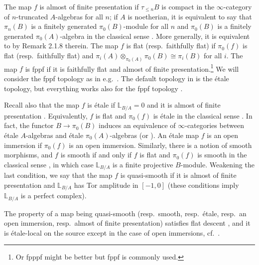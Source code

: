 \documentclass{amsart}
\theoremstyle{definition}
\theoremstyle{remark}
\numberwithin{equation}{section}
\newcommand{\bb}{\mathbb}
\begin{document}
The map $f$ is almost of finite presentation if $\tau_{\leq n} B$ is compact in the $\infty$-category of $n$-truncated $A$-algebras for all $n$; if $A$ is noetherian, it is equivalent to say that $\pi_n(B)$ is a finitely generated $\pi_0(B)$-module for all $n$ and $\pi_0(B)$ is a finitely generated $\pi_0(A)$-algebra in the classical sense \cite[Proposition 3.1.5]{LurieThesis}. More generally, it is equivalent to \cite[Definition 2.1.6]{HansenMann} by Remark 2.1.8 therein. The map $f$ is flat (resp.~faithfully flat) if $\pi_0(f)$ is flat (resp.~faithfully flat) and $\pi_i(A)\otimes_{\pi_0(A)}\pi_0(B)\cong \pi_i(B)$ for all $i$. The map $f$ is fppf if it is faithfully flat and almost of finite presentation.\footnote{Or fpppf might be better but fppf is commonly used.} We will consider the fppf topology as in e.g.~\cite{DrinfeldGaitsgory}. The default topology in \cite{GRI} is the \'etale topology, but everything works also for the fppf topology \cite[\S 2.2.3.2]{GRI}. 

Recall also that the map $f$ is \'etale if $\bb L_{B/A}=0$ and it is almost of finite presentation \cite[Definition 3.4.7]{LurieThesis}. Equivalently, $f$ is flat and $\pi_0(f)$ is \'etale in the classical sense \cite[Proposition 3.4.10]{LurieThesis}. In fact, the functor $B\to \pi_0(B)$ induces an equivalence of $\infty$-categories between \'etale $A$-algebras and \'etale $\pi_0(A)$-algebras \cite[Theorem 3.4.13]{LurieThesis} (or \cite[Proposition 5.2.4]{CesnaviciusScholze}). An \'etale map $f$ is an open immersion if $\pi_0(f)$ is an open immersion. Similarly, there is a notion of smooth morphisms, and $f$ is smooth if and only if $f$ is flat and $\pi_0(f)$ is smooth in the classical sense \cite[Proposition 3.4.9]{LurieThesis}, in which case $\bb L_{B/A}$ is a finite projective $B$-module. Weakening the last condition, we say that the map $f$ is quasi-smooth if it is almost of finite presentation and $\bb L_{B/A}$ has Tor amplitude in $[-1, 0]$ (these conditions imply $\bb L_{B/A}$ is a perfect complex). 

The property of a map being quasi-smooth (resp.~smooth, resp.~\'etale, resp.~an open immersion, resp.~almost of finite presentation) satisfies flat descent \cite[Proposition 3.5.3]{LurieThesis}, and it is \'etale-local on the source except in the case of open immersions, cf.~\cite[Lemma 2.4.15]{HansenMann}.
\end{document}
